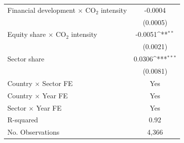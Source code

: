 {
\def\sym#1{\ifmmode^{#1}\else\(^{#1}\)\fi}
\begin{tabular}{l*{1}{c}}
Financial development $\times$ CO$_{2}$ intensity&     -0.0004         \\
                    &    (0.0005)         \\
Equity share $\times$ CO$_{2}$ intensity&     -0.0051\sym{**} \\
                    &    (0.0021)         \\
Sector share        &      0.0306\sym{***}\\
                    &    (0.0081)         \\
\hline \addlinespace[1ex] Country $\times$ Sector FE&         Yes         \\
Country $\times$ Year FE&         Yes         \\
Sector $\times$ Year FE&         Yes         \\
\hline \addlinespace[1ex] R-squared&        0.92         \\
No. Observations    &       4,366         \\
\end{tabular}
}
